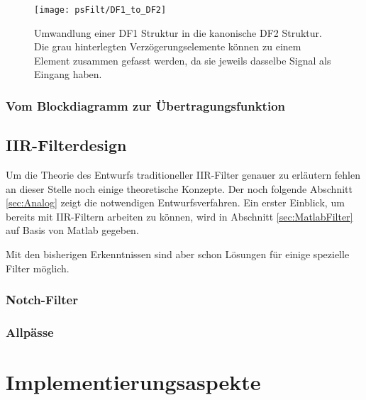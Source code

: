 \begin{figure}[H]
\begin{center}
\texttt{[image: psFilt/DF1\_to\_DF2]}
\caption{\label{pic:IIR:DF1toDFII}Umwandlung einer DF1 Struktur in
die kanonische DF2 Struktur. Die grau hinterlegten
Verzögerungselemente können zu einem Element zusammen gefasst
werden, da sie jeweils dasselbe Signal als Eingang haben.}
\end{center}
\end{figure}

\subsubsection{Vom Blockdiagramm zur Übertragungsfunktion}

\subsection{IIR-Filterdesign}
Um die Theorie des Entwurfs traditioneller IIR-Filter genauer zu erläutern fehlen an dieser Stelle noch
einige theoretische Konzepte. Der noch folgende Abschnitt \ref{sec:Analog}
zeigt die notwendigen Entwurfsverfahren.
Ein erster Einblick, um bereits mit IIR-Filtern arbeiten zu können,
wird in Abschnitt \ref{sec:MatlabFilter} auf Basis von Matlab gegeben.

Mit den bisherigen Erkenntnissen sind aber schon Lösungen für einige spezielle Filter
möglich.
\subsubsection{Notch-Filter}
\subsubsection{Allpässe}

\section{Implementierungsaspekte}
